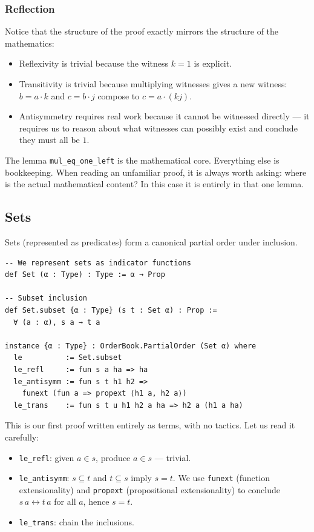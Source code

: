 \documentclass[12pt, a4paper, openright]{book}
\theoremstyle{thmstyle}
\theoremstyle{defstyle}
\newcommand{\lc}[1]{\texttt{#1}}
\begin{document}
\subsubsection{Reflection}

Notice that the structure of the proof exactly mirrors the structure of the
mathematics:
\begin{itemize}[nosep]
  \item Reflexivity is trivial because the witness $k = 1$ is explicit.
  \item Transitivity is trivial because multiplying witnesses gives a new
    witness: $b = a \cdot k$ and $c = b \cdot j$ compose to $c = a \cdot (kj)$.
  \item Antisymmetry requires real work because it cannot be witnessed
    directly --- it requires us to reason about what witnesses can possibly
    exist and conclude they must all be $1$.
\end{itemize}

The lemma \lc{mul\_eq\_one\_left} is the mathematical core. Everything else is
bookkeeping. When reading an unfamiliar proof, it is always worth asking: where
is the actual mathematical content? In this case it is entirely in that one
lemma.

\subsection{Sets}

Sets (represented as predicates) form a canonical partial order under inclusion.

\begin{verbatim}
-- We represent sets as indicator functions
def Set (α : Type) : Type := α → Prop

-- Subset inclusion
def Set.subset {α : Type} (s t : Set α) : Prop :=
  ∀ (a : α), s a → t a

instance {α : Type} : OrderBook.PartialOrder (Set α) where
  le          := Set.subset
  le_refl     := fun s a ha => ha
  le_antisymm := fun s t h1 h2 =>
    funext (fun a => propext ⟨h1 a, h2 a⟩)
  le_trans    := fun s t u h1 h2 a ha => h2 a (h1 a ha)
\end{verbatim}

This is our first proof written entirely as terms, with no tactics. Let us read it carefully:
\begin{itemize}
  \item \lc{le_refl}: given $a \in s$, produce $a \in s$ --- trivial.
  \item \lc{le_antisymm}: $s \subseteq t$ and $t \subseteq s$ imply $s = t$.
    We use \lc{funext} (function extensionality) and \lc{propext}
    (propositional extensionality) to conclude $s\,a \leftrightarrow t\,a$ for
    all $a$, hence $s = t$.
  \item \lc{le_trans}: chain the inclusions.
\end{itemize}
\end{document}
